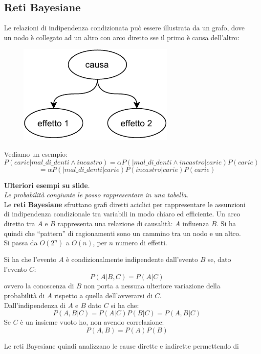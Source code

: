 \documentclass[a4paper,12pt, oneside]{book}
\begin{document}
\subsection{Reti Bayesiane}
Le relazioni di indipendenza condizionata può essere illustrata da un grafo,
dove un nodo è collegato ad un altro con arco diretto sse il primo è causa
dell'altro:
\begin{figure}[H]
  \centering
  \includegraphics[scale = 0.9]{img/b.pdf}
\end{figure}
\begin{esempio}
  Vediamo un esempio:
  \[P(carie|mal\_di\_denti\land incastro)=\alpha P(|mal\_di\_denti\land
    incastro|carie)P(carie)\]
  \[=\alpha P(|mal\_di\_denti|carie)P(incastro|carie)P(carie)\]
\end{esempio}
\textbf{Ulteriori esempi su slide}.\\
\textit{Le probabilità congiunte le posso rappresentare in una tabella.}\\
Le \textbf{reti Bayesiane} sfruttano grafi diretti aciclici per rappresentare le
assunzioni di indipendenza condizionale tra variabili in modo chiaro ed
efficiente. Un arco diretto tra $A$ e $B$ rappresenta una relazione di
causalità: $A$ influenza $B$. Si ha quindi che ``pattern'' di ragionamenti sono
un cammino tra un nodo e un altro.\\
Si passa da $O(2^n)$ a $O(n)$, per $n$ numero di effetti.
\begin{definizione}
  Si ha che l'evento $A$ è condizionalmente indipendente dall'evento $B$ se,
  dato l'evento $C$:
  \[P(A|B,C)=P(A|C)\]
  ovvero la conoscenza di $B$ non porta a nessuna ulteriore variazione della
  probabilità di $A$ rispetto a quella dell'avverarsi di $C$. \\
  Dall'indipendenza di $A$ e $B$ dato $C$ si ha che:
  \[P(A,B|C)=P(A|C)P(B|C)=P(A,B|C)\]
  Se $C$ è un insieme vuoto ho, non avendo correlazione:
  \[P(A,B)=P(A)P(B)\]
\end{definizione}
Le reti Bayesiane quindi analizzano le cause dirette e indirette permettendo di
\end{document}

